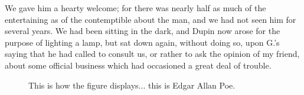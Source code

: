 We gave him a hearty welcome; for there was nearly half as much of the
entertaining as of the contemptible about the man, and we had not seen
him for several years. We had been sitting in the dark, and Dupin now
arose for the purpose of lighting a lamp, but sat down again, without
doing so, upon G.'s saying that he had called to consult us, or rather
to ask the opinion of my friend, about some official business which had
occasioned a great deal of trouble.

\begin{figure}[htbp]
\centerline{} %
\caption{This is how the figure displays... this is Edgar Allan Poe.\label{fig:example}}
\end{figure}



